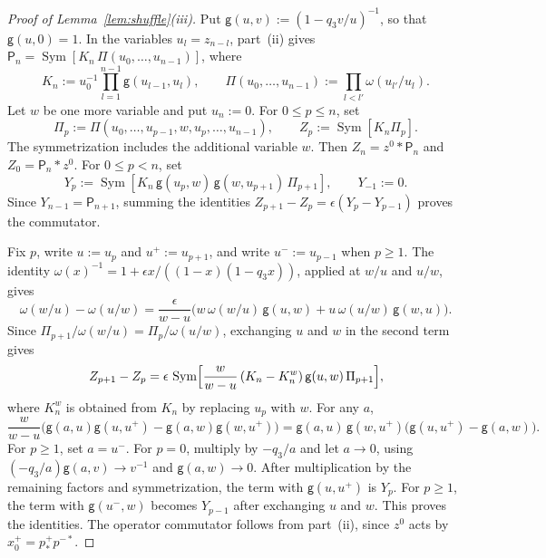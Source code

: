 \documentclass[11pt]{amsart}
\theoremstyle{definition}
\theoremstyle{remark}
\newcommand{\pulm}{p^{-*}}                       %
\newcommand{\pushp}{p^+_*}                       %
\newcommand{\xplus}[1]{x^+_{#1}}                 %
\DeclareMathOperator{\Sym}{Sym}
\begin{document}
\begin{proof}[Proof of Lemma~\ref{lem:shuffle}(iii)]
Put \(\mathsf g(u,v):=(1-q_3v/u)^{-1}\), so that \(\mathsf g(u,0)=1\).
In the variables \(u_l=z_{n-l}\), part~(ii) gives
\(\mathsf P_n=\Sym[K_n\,\Pi(u_0,\dots,u_{n-1})]\), where
\[
 K_n:=u_0^{-1}\prod_{l=1}^{n-1}\mathsf g(u_{l-1},u_l),
 \qquad
 \Pi(u_0,\dots,u_{n-1}):=\prod_{l<l'}\omega(u_{l'}/u_l).
\]
Let \(w\) be one more variable and put \(u_n:=0\). For \(0\leq p\leq n\), set
\[
 \Pi_p:=\Pi(u_0,\dots,u_{p-1},w,u_p,\dots,u_{n-1}),
 \qquad Z_p:=\Sym[K_n\Pi_p].
\]
The symmetrization includes the additional variable \(w\).
Then \(Z_n=z^0*\mathsf P_n\) and
\(Z_0=\mathsf P_n*z^0\). For \(0\leq p<n\), set
\[
 Y_p:=\Sym[K_n\,\mathsf g(u_p,w)\,\mathsf g(w,u_{p+1})\,\Pi_{p+1}],
 \qquad Y_{-1}:=0.
\]
Since \(Y_{n-1}=\mathsf P_{n+1}\), summing the identities
\(Z_{p+1}-Z_p=\epsilon(Y_p-Y_{p-1})\) proves the commutator.

Fix \(p\), write \(u:=u_p\) and \(u^+:=u_{p+1}\), and write
\(u^-:=u_{p-1}\) when \(p\geq1\). The identity
\(\omega(x)^{-1}=1+\epsilon x/((1-x)(1-q_3x))\), applied at \(w/u\) and \(u/w\), gives
\[
 \omega(w/u)-\omega(u/w)=\frac{\epsilon}{w-u}\bigl(w\,\omega(w/u)\,\mathsf g(u,w)
 +u\,\omega(u/w)\,\mathsf g(w,u)\bigr).
\]
Since \(\Pi_{p+1}/\omega(w/u)=\Pi_p/\omega(u/w)\), exchanging \(u\) and \(w\)
in the second term gives
\[
 Z_{p+1}-Z_p=\epsilon\,\Sym\Bigl[\frac{w}{w-u}\,(K_n-K_n^w)\,\mathsf g(u,w)\,\Pi_{p+1}\Bigr],
\]
where \(K_n^w\) is obtained from \(K_n\) by replacing \(u_p\) with \(w\).
For any \(a\),
\[
 \frac{w}{w-u}\bigl(\mathsf g(a,u)\mathsf g(u,u^+)-\mathsf g(a,w)\mathsf g(w,u^+)\bigr)
 =\mathsf g(a,u)\,\mathsf g(w,u^+)\bigl(\mathsf g(u,u^+)-\mathsf g(a,w)\bigr).
\]
For \(p\geq1\), set \(a=u^-\). For \(p=0\), multiply by \(-q_3/a\) and let
\(a\to0\), using \((-q_3/a)\mathsf g(a,v)\to v^{-1}\) and
\(\mathsf g(a,w)\to0\). After multiplication by the remaining factors
and symmetrization, the term with \(\mathsf g(u,u^+)\) is \(Y_p\).
For \(p\geq1\), the term with \(\mathsf g(u^-,w)\) becomes \(Y_{p-1}\) after
exchanging \(u\) and \(w\). This proves the identities.
The operator commutator follows from part~(ii), since \(z^0\) acts by
\(\xplus{0}=\pushp\pulm\).
\end{proof}
\end{document}
